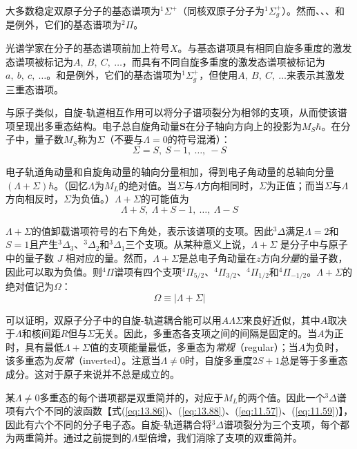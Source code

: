     大多数稳定双原子分子的基态谱项为$^1\Sigma^+$（同核双原子分子为$^1\Sigma^+_g$）。然而、、、和是例外，它们的基态谱项为$^2\Pi$。

    光谱学家在分子的基态谱项前加上符号$X$。与基态谱项具有相同自旋多重度的激发态谱项被标记为$A,\:B,\:C,\:\ldots$，而具有不同自旋多重度的激发态谱项被标记为$a,\:b,\:c,\:\ldots$。和是例外，它们的基态谱项为$^1\Sigma^+_g$，但使用$A,\:B,\:C,\:\ldots$来表示其激发三重态谱项。

    与原子类似，自旋-轨道相互作用可以将分子谱项裂分为相邻的支项，从而使该谱项呈现出多重态结构。电子总自旋角动量$\mathbf{S}$在分子轴向方向上的投影为$M_S\hbar$。在分子中，量子数$M_S$称为$\Sigma$（不要与$\Lambda=0$的符号混淆）：
    \begin{equation*}
        \Sigma = S,\: S-1,\: \ldots,\: -S
    \end{equation*}

    电子轨道角动量和自旋角动量的轴向分量相加，得到电子角动量的总轴向分量$\left(\Lambda + \Sigma\right)\hbar$。（回忆$\Lambda$为$M_L$的绝对值。当$\Sigma$与$\Lambda$方向相同时，$\Sigma$为正值；而当$\Sigma$与$\Lambda$方向相反时，$\Sigma$为负值。）$\Lambda+\Sigma$的可能值为
    \begin{equation*}
        \Lambda + S,\: \Lambda + S - 1,\: \ldots,\: \Lambda - S
    \end{equation*}

    $\Lambda+\Sigma$的值卸载谱项符号的右下角处，表示该谱项的支项。因此$^3\Delta$满足$\Lambda=2$和$S=1$且产生$^3\Delta_3$、$^3\Delta_2$和$^3\Delta_1$三个支项。从某种意义上说，$\Lambda+\Sigma$ 是分子中与原子中的量子数 $J$ 相对应的量。然而，$\Lambda+\Sigma$是总电子角动量在$z$方向\textit{分量}的量子数，因此可以取为负值。则$^4\Pi$谱项有四个支项$^4\Pi_{5/2}$、$^4\Pi_{3/2}$、$^4\Pi_{1/2}$和$^4\Pi_{-1/2}$。$\Lambda+\Sigma$的绝对值记为$\Omega$：
    \begin{equation}
        \Omega \equiv \left| \Lambda + \Sigma \right|
        \label{eq:13.90}
    \end{equation}

    可以证明，双原子分子中的自旋-轨道耦合能可以用$A\Lambda\Sigma$来良好近似，其中$A$取决于$\Lambda$和核间距$R$但与$\Sigma$无关。因此，多重态各支项之间的间隔是固定的。当$A$为正时，具有最低$\Lambda+\Sigma$值的支项能量最低，多重态为\textit{常规}（regular）；当$A$为负时，该多重态为\textit{反常}（inverted）。注意当$\Lambda \neq 0$时，自旋多重度$2S+1$总是等于多重态成分。这对于原子来说并不总是成立的。

    某$\Lambda \neq 0$多重态的每个谱项都是双重简并的，对应于$M_L$的两个值。因此一个$^3\Delta$谱项有六个不同的波函数【式(\ref{eq:13.86})、(\ref{eq:13.88})、(\ref{eq:11.57})、(\ref{eq:11.59})】，因此有六个不同的分子电子态。自旋-轨道耦合将$^3\Delta$谱项裂分为三个支项，每个都为两重简并。通过之前提到的$\Lambda$型倍增，我们消除了支项的双重简并。

